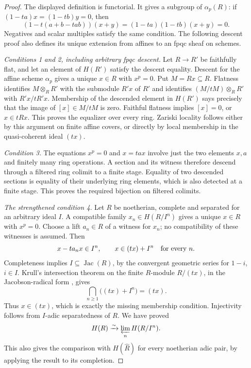 \begin{proof}
The displayed definition is functorial. It gives a subgroup of
$\alpha_p(R)$: if $(1-ta)x=(1-tb)y=0$, then
\[
 (1-t(a+b-tab))(x+y)=(1-ta)(1-tb)(x+y)=0.
\]
Negatives and scalar multiples satisfy the same condition. The
following descent proof also defines its unique extension from
affines to an fpqc sheaf on schemes.

\emph{Conditions 1 and 2, including arbitrary fpqc descent.}
Let $R\to R'$ be faithfully flat, and let an element of $H(R')$
satisfy the descent equality. Descent for the affine scheme
$\alpha_p$ gives a unique $x\in R$ with $x^p=0$.
Put $M=Rx\subseteq R$. Flatness identifies
$M\otimes_R R'$ with the submodule $R'x$ of $R'$ and identifies
$(M/tM)\otimes_R R'$ with $R'x/tR'x$. Membership of the descended
element in $H(R')$ says precisely that the image of $[x]\in M/tM$
is zero. Faithful flatness implies $[x]=0$, or $x\in tRx$.
This proves the equalizer over every ring. Zariski locality follows
either by this argument on finite affine covers, or directly by
local membership in the quasi-coherent ideal $(tx)$.

\emph{Condition 3.}
The equations $x^p=0$ and $x=tax$ involve just the two elements
$x,a$ and finitely many ring operations. A section and its witness
therefore descend through a filtered ring colimit to a finite
stage. Equality of two descended sections is equality of their
underlying ring elements, which is also detected at a finite
stage. This proves the required bijection on filtered colimits.

\emph{The strengthened condition 4.}
Let $R$ be noetherian, complete and separated for an arbitrary
ideal $I$. A compatible family $x_n\in H(R/I^n)$ gives a unique
$x\in R$ with $x^p=0$. Choose a lift $a_n\in R$ of a witness
for $x_n$; no compatibility of these witnesses is assumed. Then
\[
 x-ta_nx\in I^n,\qquad
 x\in (tx)+I^n\quad\hbox{for every }n.
\]
Completeness implies $I\subseteq\operatorname{Jac}(R)$, by the
convergent geometric series for $1-i$, $i\in I$. Krull's
intersection theorem on the finite $R$-module $R/(tx)$,
in the Jacobson-radical form \cite[Lemma 10.51.5(2)]{StacksKrullJac}, gives
\[
 \bigcap_{n\geq1}\bigl((tx)+I^n\bigr)=(tx).
\]
Thus $x\in(tx)$, which is exactly the missing membership
condition. Injectivity follows from $I$-adic separatedness of
$R$. We have proved
\[
 H(R)\xrightarrow{\sim}\varprojlim_n H(R/I^n).
\]
This also gives the comparison with $H(\widehat R)$ for every
noetherian adic pair, by applying the result to its completion.


\end{proof}
